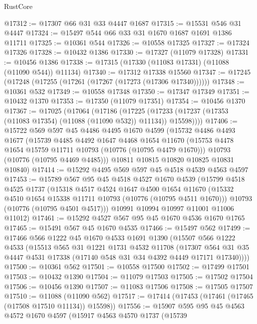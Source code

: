 \begin{lexlean}{RustCore}
\begin{coremodule}
@17312 := @17307 @66 @31 @33 @4447 @1687
@17315 := @15531 @546 @31 @4447
@17324 := @15497 @544 @66 @33 @31 @1670 @1687 @1691 @1386 @11711
@17325 := @10361 @544
@17326 := @10558 @17325
@17327 := @17324 @17326
@17328 := @10432 @1386
@17330 := @17327 (@11079 @17328)
@17331 := @10456 @1386
@17338 := @17315 (@17330 (@11083 @17331) (@11088 (@11090 @544)) @11134)
@17340 := @17312 @17338 @15560
@17347 := @17245 (@17248 (@17255 (@17261 (@17267 (@17273 (@17306 @17340))))))
@17348 := @10361 @532
@17349 := @10558 @17348
@17350 := @17347 @17349
@17351 := @10432 @1370
@17353 := @17350 (@11079 @17351)
@17354 := @10456 @1370
@17367 := @17025
    (@17064
      (@17186
        (@17225 (@17233 (@17237 (@17353 (@11083 @17354) (@11088 (@11090 @532)) @11134)) @15598))))
@17406 := @15722
    @569
    @597
    @45
    @4486
    @4495
    @1670
    @4599
    (@15732
      @4486
      @4493
      @1677
      (@15739
        @4485
        @4492
        @1647
        @4468
        @1654
        @11670
        (@15753 @4478 @1654 @15759 @11711 @10793 (@10776 (@10795 @4479 @1670)))
        @10793
        (@10776 (@10795 @4469 @4485)))
      @10811
      @10815
      @10820
      @10825
      @10831
      @10840)
@17414 := @15292 @4495 @569 @597 @45 @4518 @4539 @4563 @4597
@17453 := @15789
    @567
    @95
    @45
    @4518
    @4527
    @1670
    @4539
    (@15799
      @4518
      @4525
      @1737
      (@15318
        @4517
        @4524
        @1647
        @4500
        @1654
        @11670
        (@15332 @4510 @1654 @15338 @11711 @10793 (@10776 (@10795 @4511 @1670)))
        @10793
        (@10776 (@10795 @4501 @4517)))
      @10991
      @10994
      @10997
      @11001
      @11006
      @11012)
@17461 := @15292 @4527 @567 @95 @45 @1670 @4536 @1670 @1765
@17465 := @15491 @567 @45 @1670 @4535
@17466 := @15497 @562
@17499 := @17466
    @566
    @1222
    @45
    @1670
    @4533
    @1691
    @1390
    (@15507
      @566
      @1222
      @4533
      (@15513
        @565
        @31
        @1221
        @1731
        @4532
        @11708
        (@17307 @564 @31 @35 @4447 @4531 @17338 (@17140 @548 @31 @34 @4392 @4449 @17171 @17340))))
@17500 := @10361 @562
@17501 := @10558 @17500
@17502 := @17499 @17501
@17503 := @10432 @1390
@17504 := @11079 @17503
@17505 := @17502 @17504
@17506 := @10456 @1390
@17507 := @11083 @17506
@17508 := @17505 @17507
@17510 := @11088 (@11090 @562)
@17517 := @17414 (@17453 (@17461 (@17465 (@17508 @17510 @11134)) @15598))
@17556 := @15907
    @595
    @95
    @45
    @4563
    @4572
    @1670
    @4597
    (@15917
      @4563
      @4570
      @1737
      (@15739

\end{coremodule}
\end{lexlean}
